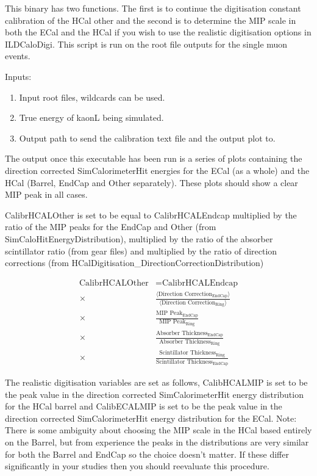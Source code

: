 \documentclass[11pt, oneside]{article}   	%
\begin{document}
This binary has two functions.  The first is to continue the digitisation constant calibration of the HCal other and the second is to determine the MIP scale in both the ECal and the HCal if you wish to use the realistic digitisation options in ILDCaloDigi.  This script is run on the root file outputs for the single muon events.

Inputs:
\begin{enumerate}
\item Input root files, wildcards can be used.
\item True energy of kaonL being simulated.
\item Output path to send the calibration text file and the output plot to.
\end{enumerate}

The output once this executable has been run is a series of plots containing the direction corrected SimCalorimeterHit energies for the ECal (as a whole) and the HCal (Barrel, EndCap and Other separately).  These plots should show a clear MIP peak in all cases.

\vspace{1cm}

CalibrHCALOther is set to be equal to CalibrHCALEndcap multiplied by the ratio of the MIP peaks for the EndCap and Other (from SimCaloHitEnergyDistribution), multiplied by the ratio of the absorber scintillator ratio (from gear files) and multiplied by the ratio of direction corrections (from HCalDigitisation\_DirectionCorrectionDistribution)

\begin{equation}
\begin{split}
\text{CalibrHCALOther} & = \text{CalibrHCALEndcap} \\ \times &  \frac{\langle \text{Direction Correction}_\text{EndCap} \rangle}{\langle \text{Direction Correction}_\text{Ring} \rangle} \\ \times & \frac{ \text{MIP Peak}_\text{EndCap} }{ \text{MIP Peak}_\text{Ring} } \\ \times & \frac{ \text{Absorber Thickness}_\text{EndCap} }{ \text{Absorber Thickness}_\text{Ring} } \\ \times & \frac{ \text{Scintillator Thickness}_\text{Ring} }{ \text{Scintillator Thickness}_\text{EndCap}}
\end{split}
\end{equation}

The realistic digitisation variables are set as follows, CalibHCALMIP is set to be the peak value in the direction corrected SimCalorimeterHit energy distribution for the HCal barrel and CalibECALMIP is set to be the peak value in the direction corrected SimCalorimeterHit energy distribution for the ECal.  Note: There is some ambiguity about choosing the MIP scale in the HCal based entirely on the Barrel, but from experience the peaks in the distributions are very similar for both the Barrel and EndCap so the choice doesn't matter.  If these differ significantly in your studies then you should reevaluate this procedure.
\end{document}

